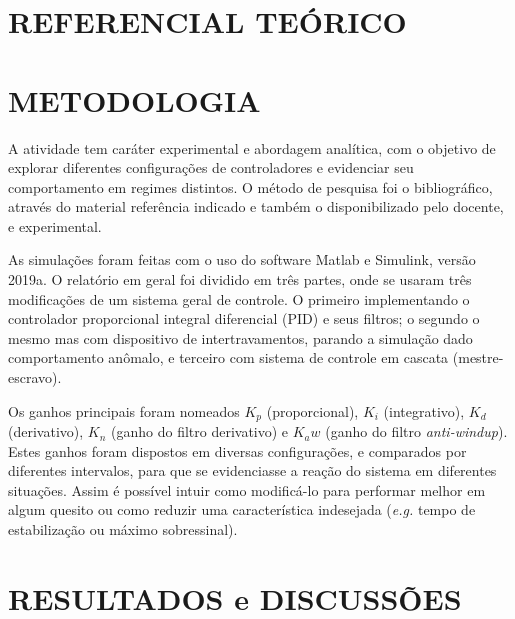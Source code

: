 \documentclass[a4paper,12pt]{article}
\begin{document}
\newpage


\thispagestyle{main}

\section{REFERENCIAL TEÓRICO}


\newpage


\thispagestyle{main}

\section{METODOLOGIA}\hspace{4ex}
A atividade tem caráter experimental e abordagem analítica, com o objetivo de explorar diferentes configurações de controladores e evidenciar seu comportamento em regimes distintos. O método de pesquisa foi o bibliográfico, através do material referência indicado e também o disponibilizado pelo docente, e experimental.

As simulações foram feitas com o uso do software Matlab e Simulink, versão 2019a. O relatório em geral foi dividido em três partes, onde se usaram três modificações de um sistema geral de controle. O primeiro implementando o controlador proporcional integral diferencial (PID) e seus filtros; o segundo o mesmo mas com dispositivo de intertravamentos, parando a simulação dado comportamento anômalo, e terceiro com sistema de controle em cascata (mestre-escravo).

Os ganhos principais foram nomeados $K_p$ (proporcional), $K_i$ (integrativo), $K_d$ (derivativo), $K_n$ (ganho do filtro derivativo) e $K_aw$ (ganho do filtro \emph{anti-windup}). Estes ganhos foram dispostos em diversas configurações, e comparados por diferentes intervalos, para que se evidenciasse a reação do sistema em diferentes situações. Assim é possível intuir como modificá-lo para performar melhor em algum quesito ou como reduzir uma característica indesejada (\emph{e.g.} tempo de estabilização ou máximo sobressinal).
%
\newpage
%
%
%
\thispagestyle{main}
%
\section{RESULTADOS e DISCUSSÕES}%

%
%
%
%
\end{document}
